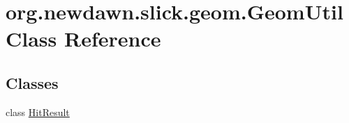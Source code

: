 \hypertarget{classorg_1_1newdawn_1_1slick_1_1geom_1_1_geom_util}{}\section{org.\+newdawn.\+slick.\+geom.\+Geom\+Util Class Reference}
\label{classorg_1_1newdawn_1_1slick_1_1geom_1_1_geom_util}
\subsection*{Classes}
\begin{DoxyCompactItemize}
\item 
class \mbox{\hyperlink{classorg_1_1newdawn_1_1slick_1_1geom_1_1_geom_util_classorg_1_1newdawn_1_1slick_1_1geom_1_1_geom_util_1_1_hit_result}{Hit\+Result}}
\end{DoxyCompactItemize}
